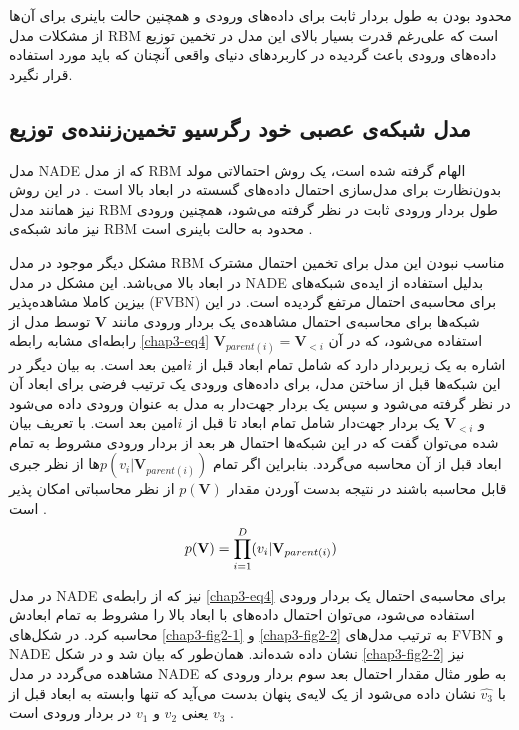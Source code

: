 محدود بودن به طول بردار ثابت برای داده‌های ورودی و همچنین حالت باینری برای آن‌ها از مشکلات مدل
RBM
است که علی‌رغم قدرت بسیار بالای این مدل در تخمین توزیع داده‌های ورودی باعث گردیده در کاربردهای دنیای واقعی‌ آنچنان که باید مورد استفاده قرار نگیرد.
	
	\subsection{مدل شبکه‌‌ی عصبی خود رگرسیو تخمین‌زننده‌ی توزیع }
	\label{chap3sec2sub2}
	مدل
	NADE
	که از مدل
	RBM
	الهام گرفته شده است، یک روش احتمالاتی مولد بدون‌نظارت برای مدل‌سازی احتمال داده‌های گسسته در ابعاد بالا است
	\cite{larochelle2011neural}.
	 در این روش نیز همانند مدل
	RBM
	طول بردار ورودی ثابت در نظر گرفته می‌‌شود، همچنین ورودی نیز ماند شبکه‌ی
	RBM
	محدود به حالت باینری است
	\cite{larochelle2011neural}.
	
	 مشکل دیگر موجود در مدل
	RBM
	 مناسب نبودن این مدل برای تخمین احتمال مشترک در ابعاد بالا می‌باشد. این مشکل در مدل
	NADE 
	بدلیل استفاده از ایده‌ی شبکه‌های بیزین کاملا مشاهده‌پذیر
		(FVBN)
	\cite{dayan1996does}\cite{bengio1999modeling}
	برای محاسبه‌ی احتمال مرتفع گردیده است. در این شبکه‌ها برای محاسبه‌ی احتمال مشاهده‌ی یک بردار ورودی مانند
	$\textbf{V}$
	توسط مدل از رابطه‌ای مشابه رابطه
	\ref{chap3-eq4}
	استفاده می‌‌شود، که در آن
	$\textbf{V}_{parent(i)} = \textbf{V}_{<i}$
	اشاره به یک زیربردار دارد که شامل تمام ابعاد قبل از
	$i$امین 
بعد است. به بیان دیگر در این شبکه‌ها قبل از ساختن مدل، برای داده‌های ورودی یک ترتیب فرضی‌ برای ابعاد آن در نظر گرفته می‌‌شود و سپس یک بردار جهت‌دار به مدل به عنوان ورودی داده می‌‌شود و
	$\textbf{V}_{<i}$
	 یک بردار جهت‌دار شامل تمام ابعاد تا قبل از
	$i$امین 
	بعد است. با تعریف بیان شده می‌‌توان گفت که در این شبکه‌ها احتمال هر بعد از بردار ورودی مشروط به تمام ابعاد قبل از آن محاسبه می‌گردد. بنابراین اگر تمام
	$p(v_i|\textbf{V}_{parent(i)})$ها
	از نظر جبری قابل محاسبه باشند در نتیجه بدست آوردن مقدار
	$p(\textbf{V})$
	از نظر محاسباتی امکان پذیر است
	\cite{larochelle2011neural}.
	\begin{align}
	\centering
	\label{chap3-eq4}
	p(\textbf{V}) = \prod_{i=1}^{D}(v_i|\textbf{V}_{parent(i)})
	\end{align}
	
	در مدل
	NADE
	نیز که از رابطه‌ی
	\ref{chap3-eq4}
	برای محاسبه‌ی احتمال یک بردار ورودی استفاده می‌شود، می‌‌توان احتمال داده‌های با ابعاد بالا را مشروط به تمام ابعادش محاسبه کرد. در شکل‌های
	\ref{chap3-fig2-1}
	و
	\ref{chap3-fig2-2}
	به ترتیب مدل‌های
	FVBN
	و
	NADE
	نشان داده شده‌اند. همان‌طور که بیان شد و در شکل
	\ref{chap3-fig2-2}
	نیز مشاهده می‌‌گردد در مدل
	NADE
	به طور مثال مقدار احتمال بعد سوم بردار ورودی که با
	$\hat{v_3}$
	نشان داده می‌‌شود از یک لایه‌ی پنهان بدست می‌‌آید که تنها وابسته به ابعاد قبل از
	$v_3$
	یعنی‌
	$v_2$
	و
	$v_1$
	در بردار ورودی است
	\cite{larochelle2011neural}.


